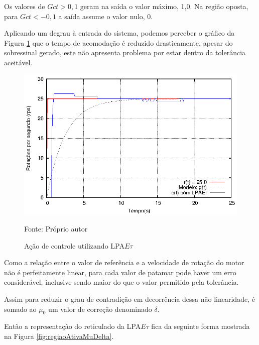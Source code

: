 Os valores de $Gct > 0,1$ geram na saída o valor máximo,
1,0. Na região oposta, para $Gct < -0,1$ a saída assume
 o valor nulo, 0. 

Aplicando um degrau à entrada do sistema, 
podemos perceber o gráfico da 
Figura \ref{fig:acaoLPAEtgct100} 
que o tempo de acomodação é reduzido drasticamente, 
apesar do sobressinal gerado, 
este não apresenta problema por estar 
dentro da tolerância aceitável. 


\begin{figure}[!htb]
\caption{Ação de controle utilizando LPA$E\tau$}
\vspace{-1cm}\center\includegraphics[scale=1.6]{./imagens/LPAEt-gct100.eps}
\label{fig:acaoLPAEtgct100}

{\small Fonte: Próprio autor}
\end{figure}

Como a relação entre o valor de referência e a 
velocidade de rotação do motor não é perfeitamente linear,
para cada valor de patamar pode haver um erro considerável,
inclusive sendo maior do que o valor permitido pela 
tolerância. 

Assim para reduzir o grau de contradição
em decorrência dessa não linearidade, 
é somado ao $\mu_0$ um valor de correção denominado $\delta$.

Então a representação do reticulado da LPA$E\tau$ 
fica da seguinte forma mostrada na 
Figura \ref{fig:regiaoAtivaMuDelta}. 



